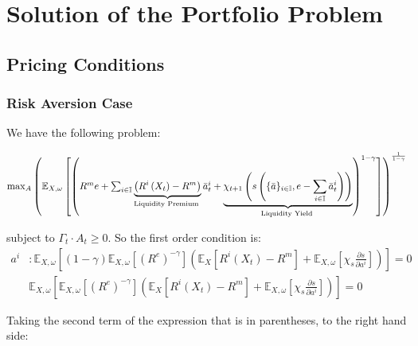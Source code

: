 
\section{Solution of the Portfolio Problem}

\subsection{Pricing Conditions}

\subsubsection{Risk Aversion Case}

{\small We have the following problem:}{\small\par}
\begin{center}
{\small$\max_{A}\left(\mathbb{E}_{X,\omega}\left[\left(R^{m}e+\sum_{i\in\mathbb{I}}\underbrace{\left(R^{i}\left(X_{t}\right)-R^{m}\right)}_{\text{Liquidity Premium }}\bar{a}_{t}^{i}+\text{\ensuremath{\underbrace{\chi_{t+1}\left(s\left(\{\bar{a}\}_{i \in\mathbb{I}}, e-\sum_{i \in\mathbb{I}} \bar{a}_{t}^{i}\right)\right)}_{\text{Liquidity Yield }}}}\right)^{1-\gamma}\right]\right)^{\frac{1}{1-\gamma}}$}{\small\par}
\par\end{center}

\begin{flushleft}
{\small subject to $\Gamma_{t}\cdot A_{t}\geq0$. So the first order
condition is:}
\begin{align*}
a^{i} & :\mathbb{E}_{X,\omega}\left[\left(1-\gamma\right)\mathbb{E}_{X,\omega}\left[\left(R^{e}\right)^{-\gamma}\right]\left(\mathbb{E}_{X}\left[R^{i}\left(X_{t}\right)-R^{m}\right]+\mathbb{E}_{X,\omega}\left[\chi_{s}\frac{\partial s}{\partial a^{i}}\right]\right)\right]=0\\
 & \mathbb{E}_{X,\omega}\left[\mathbb{E}_{X,\omega}\left[\left(R^{e}\right)^{-\gamma}\right]\left(\mathbb{E}_{X}\left[R^{i}\left(X_{t}\right)-R^{m}\right]+\mathbb{E}_{X,\omega}\left[\chi_{s}\frac{\partial s}{\partial a^{i}}\right]\right)\right]=0
\end{align*}
\par\end{flushleft}

\begin{flushleft}
{\small Taking the second term of the expression that is in parentheses,
to the right hand side:}{\small\par}
\par\end{flushleft}

